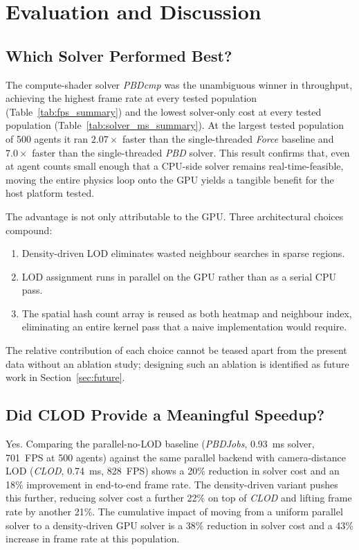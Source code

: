 \section{Evaluation and Discussion}
\label{sec:eval}

\subsection{Which Solver Performed Best?}

The compute-shader solver \textit{PBDcmp} was the unambiguous winner
in throughput, achieving the highest frame rate at every tested
population (Table~\ref{tab:fps_summary}) and the lowest solver-only
cost at every tested population
(Table~\ref{tab:solver_ms_summary}).  At the largest tested population
of 500 agents it ran $2.07\times$ faster than the single-threaded
\textit{Force} baseline and $7.0\times$ faster than the single-threaded
\textit{PBD} solver.  This result confirms that, even at agent counts
small enough that a CPU-side solver remains real-time-feasible,
moving the entire physics loop onto the GPU yields a tangible benefit
for the host platform tested.

The advantage is not only attributable to the GPU.  Three architectural
choices compound:
\begin{enumerate}[topsep=2pt,itemsep=2pt]
    \item Density-driven LOD eliminates wasted neighbour searches in
    sparse regions.
    \item LOD assignment runs in parallel on the GPU rather than as a
    serial CPU pass.
    \item The spatial hash count array is reused as both heatmap and
    neighbour index, eliminating an entire kernel pass that a naive
    implementation would require.
\end{enumerate}

The relative contribution of each choice cannot be teased apart from
the present data without an ablation study; designing such an ablation
is identified as future work in Section~\ref{sec:future}.

\subsection{Did CLOD Provide a Meaningful Speedup?}

Yes.  Comparing the parallel-no-LOD baseline (\textit{PBDJobs},
0.93~ms solver, 701~FPS at 500 agents) against the same parallel
backend with camera-distance LOD (\textit{CLOD}, 0.74~ms, 828~FPS) shows
a 20\% reduction in solver cost and an 18\% improvement in end-to-end
frame rate.  The density-driven variant pushes this further, reducing
solver cost a further 22\% on top of \textit{CLOD} and lifting frame
rate by another 21\%.  The cumulative impact of moving from a uniform
parallel solver to a density-driven GPU solver is a 38\% reduction in
solver cost and a 43\% increase in frame rate at this population.

